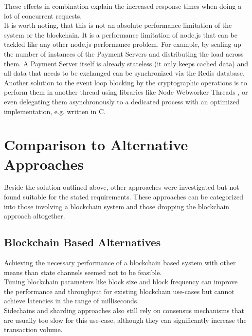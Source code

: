 \documentclass[a4paper,12pt]{scrartcl}
\begin{document}
These effects in combination explain the increased response times when doing a lot of concurrent requests.\\

It is worth noting, that this is not an absolute performance limitation of the system or the blockchain. It is a performance limitation of node.js that can be tackled like any other node.js performance problem. For example, by scaling up the number of instances of the Payment Servers and distributing the load across them. A Payment Server itself is already stateless (it only keeps cached data) and all data that needs to be exchanged can be synchronized via the Redis database.\\
Another solution to the event loop blocking by the cryptographic operations is to perform them in another thread using libraries like Node Webworker Threads \cite{web55}, or even delegating them asynchronously to a dedicated process with an optimized implementation, e.g. written in C.

\newpage
\section{Comparison to Alternative Approaches}

Beside the solution outlined above, other approaches were investigated but not found suitable for the stated requirements. These approaches can be categorized into those involving a blockchain system and those dropping the blockchain approach altogether.

\subsection{Blockchain Based Alternatives}

Achieving the necessary performance of a blockchain based system with other means than state channels seemed not to be feasible.\\

Tuning blockchain parameters like block size and block frequency can improve the performance and throughput for existing blockchain use-cases but cannot achieve latencies in the range of milliseconds.\\

Sidechains and sharding approaches also still rely on consensus mechanisms that are usually too slow for this use-case, although they can significantly increase the transaction volume.\\
\end{document}

